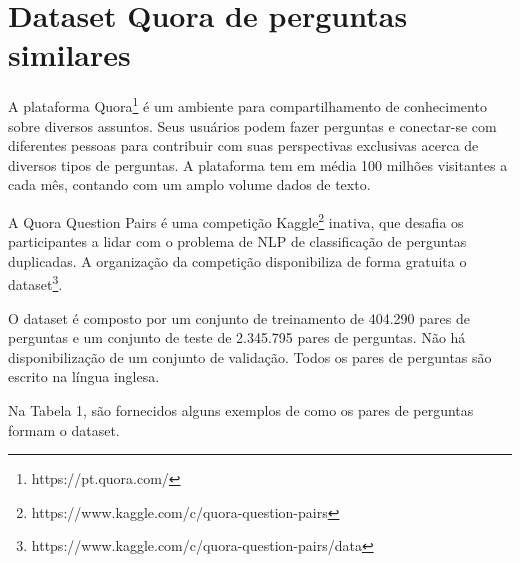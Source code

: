 \documentclass[conference]{IEEEtran}
\begin{document}
\section{Dataset Quora de perguntas similares}

A plataforma Quora\footnote{https://pt.quora.com/} é um ambiente para compartilhamento de conhecimento sobre diversos assuntos. Seus usuários podem fazer perguntas e conectar-se com diferentes pessoas para contribuir com suas perspectivas exclusivas acerca de diversos tipos de perguntas. A plataforma tem em média 100 milhões visitantes a cada mês, contando com um amplo volume dados de texto. 

A Quora Question Pairs é uma competição Kaggle\footnote{https://www.kaggle.com/c/quora-question-pairs} inativa, que desafia os participantes a lidar com o problema de NLP de classificação de perguntas duplicadas. A organização da competição disponibiliza de forma gratuita o dataset\footnote{https://www.kaggle.com/c/quora-question-pairs/data}.

O dataset é composto por um conjunto de treinamento de 404.290 pares de perguntas e um conjunto de teste de 2.345.795 pares de perguntas. Não há disponibilização de um conjunto de validação. Todos os pares de perguntas são escrito na língua inglesa.

Na Tabela 1, são fornecidos alguns exemplos de como os pares de perguntas formam o dataset.
\end{document}
